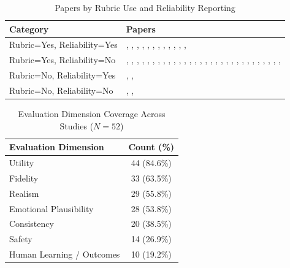 \begin{table}[tbp]
\centering
\small
\begin{tabular}{p{4cm}p{10.5cm}}
\toprule
\textbf{Category} & \textbf{Papers} \\
\midrule
Rubric=Yes, Reliability=Yes & \cite{Aghakhani2025From}, \cite{Cai2026Exploring}, \cite{Chiu2024A}, \cite{Feng2025Reframe}, \cite{Gabriel2024Can}, \cite{Kuhail2025Human-Human}, \cite{Li2024Understanding}, \cite{Louie2024Roleplay-doh}, \cite{Samuel2025PersonaGym}, \cite{Xie2025PsyDT}, \cite{Xu2025MentalChat16K}, \cite{Yang2025CAMI}, \cite{Yang2025Consistent} \\
\midrule
Rubric=Yes, Reliability=No & \cite{Basar2024To}, \cite{Basar2025How}, \cite{Berrezueta-Guzman2024Future}, \cite{Chen2023LLM-empowered}, \cite{Chen2025MIND}, \cite{Deshpande2025Evaluating}, \cite{Fouda2026PsychiatryBench}, \cite{Kang2024Can}, \cite{Kim2025Can}, \cite{Kim2025KMI}, \cite{Kim2025MIRROR}, \cite{Lee2024CACTUS}, \cite{Liu2023ChatCounselor}, \cite{Liu2025Eeyore}, \cite{Louie2026Can}, \cite{Na2024CBT-LLM}, \cite{Nguyen2025Do}, \cite{Ozgun2025Trustworthy}, \cite{Qiu2025EmoAgent}, \cite{Qiu2026PsyCLIENT}, \cite{Schmidgall2025AgentClinic}, \cite{Schmidmaier2025Using}, \cite{Sharma2023Cognitive}, \cite{Sungarda2025GenAI}, \cite{Wang2024PATIENT}, \cite{Wang2024Towards}, \cite{Wang2025CARE-Bench}, \cite{Wang2025Psychological}, \cite{Xiao2024HealMe}, \cite{Xu2025MultiAgentESC}, \cite{Zhang2025CBT-BENCH} \\
\midrule
Rubric=No, Reliability=Yes & \cite{Haydarov2025Towards}, \cite{Tanana2019Development}, \cite{Wang2025AnnaAgent} \\
\midrule
Rubric=No, Reliability=No & \cite{Jaiswal2024Building}, \cite{Kermani2025Systematic}, \cite{Schmidmaier2025UsingNonverbal} \\

\bottomrule
\end{tabular}
\caption{Papers by Rubric Use and Reliability Reporting}
\label{tab:rubric-reliability-cite}
\end{table}

\begin{table}[tbp]
\centering
\small
\begin{tabular}{lc}
\toprule
\textbf{Evaluation Dimension} & \textbf{Count (\%)} \\
\midrule
Utility & 44 (84.6\%) \\
Fidelity & 33 (63.5\%) \\
Realism & 29 (55.8\%) \\
Emotional Plausibility & 28 (53.8\%) \\
Consistency & 20 (38.5\%) \\
Safety & 14 (26.9\%) \\
Human Learning / Outcomes & 10 (19.2\%) \\
\bottomrule
\end{tabular}
\caption{Evaluation Dimension Coverage Across Studies ($N=52$)}
\label{tab:eval-dimensions}
\end{table}


